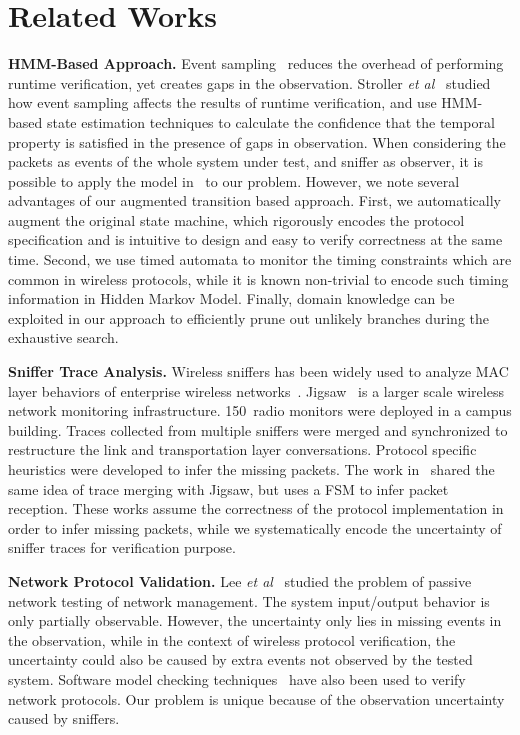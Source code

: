 \section{Related Works}
\label{sec:related}

\textbf{HMM-Based Approach.} Event
sampling~\cite{bonakdarpour2011sampling,hauswirth2004low,arnold2008qvm,fei2006artemis}
reduces the overhead of performing runtime verification, yet creates gaps in the
observation. Stroller \textit{et al}~\cite{stoller2011runtime} studied how event
sampling affects the results of runtime verification, and use HMM-based state
estimation techniques to calculate the confidence that the temporal property is
satisfied in the presence of gaps in observation. When considering the packets
as events of the whole system under test, and sniffer as observer, it is
possible to apply the model in~\cite{stoller2011runtime} to our problem.
However, we note several advantages of our augmented transition based approach.
First, we automatically augment the original state machine, which rigorously
encodes the protocol specification and is intuitive to design and easy to verify
correctness at the same time. Second, we use timed automata to monitor the
timing constraints which are common in wireless protocols, while it is known
non-trivial to encode such timing information in Hidden Markov Model. Finally,
domain knowledge can be exploited in our approach to efficiently prune out
unlikely branches during the exhaustive search.

\textbf{Sniffer Trace Analysis.} Wireless sniffers has been widely used to
analyze MAC layer behaviors of enterprise wireless
networks~\cite{sheng:wicom2008,tan:tmc2014,yeo-wise04,yeo:witmemo2005}.
Jigsaw~\cite{Cheng:2006:JSP:1159913.1159920} is a larger scale wireless network
monitoring infrastructure. 150~radio monitors were deployed in a campus
building. Traces collected from multiple sniffers were merged and synchronized
to restructure the link and transportation layer conversations. Protocol
specific heuristics were developed to infer the missing packets. The work
in~\cite{Mahajan:2006:AMB:1159913.1159923} shared the same idea of trace merging
with Jigsaw, but uses a FSM to infer packet reception. These works assume the
correctness of the protocol implementation in order to infer missing packets,
while we systematically encode the uncertainty of sniffer traces for
verification purpose.

\textbf{Network Protocol Validation.} Lee \textit{et al}~\cite{lee1997passive}
studied the problem of passive network testing of network management. The system
input/output behavior is only partially observable. However, the uncertainty
only lies in missing events in the observation, while in the context of wireless
protocol verification, the uncertainty could also be caused by extra events not
observed by the tested system. Software model checking
techniques~\cite{musuvathi2002cmc, godefroid1997model} have also been used to
verify network protocols. Our problem is unique because of the observation
uncertainty caused by sniffers.

